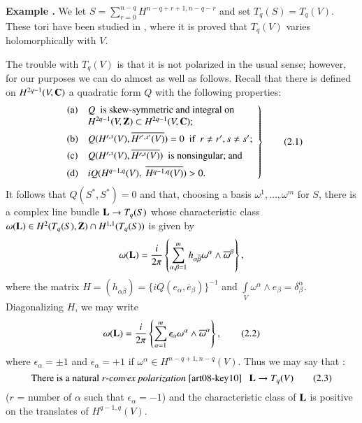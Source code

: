 \medskip
\noindent
{\bf Example .\label{art08-sec2-exam1}}
We let $S=\sum\limits^{n-q}_{r=0}H^{n-q+r+1,n-q-r}$ and set $T_{q}(S)=T_{q}(V)$. These tori have been studied in \cite{art08-key9}, where it is proved that $T_{q}(V)$ varies holomorphically with $V$.
\smallskip

The trouble with $T_{q}(V)$ is that it is not polarized in the usual sense; however, for our purposes we can do almost as well as follows. Recall \cite{art08-key23} that there is defined on $H^{2q-1}(V,\mathbf{C})$ a quadratic form $Q$ with the following properties:
\begin{equation*}
\left.
\begin{array}{cl}
{\rm(a)} & Q \text{~ is skew-symmetric and integral on ~}\\
         & H^{2q-1}(V,\mathbf{Z})\subset H^{2q-1}(V,\mathbf{C});\\[4pt]
{\rm(b)} & Q(H^{r,s}(V),\overline{H^{r',s'}(V)})=0\text{~ if~ } r\neq r', s\neq s';\\[4pt]
{\rm(c)} & Q(H^{r,s}(V),\overline{H^{r,s}(V)})\text{~ is nonsingular; and}\\[4pt]
{\rm(d)} & iQ(H^{q-1,q}(V), \ \overline{H^{q-1,q}(V)})>0.
\end{array}
\right\}\tag{2.1}\label{art08-sec2-eq2.1}
\end{equation*}
It follows that $Q(S^{*},S^{*})=0$ and that, choosing a basis $\omega^{1},\ldots,\omega^{m}$ for $S$, there is a complex line bundle $\mathbf{L}\to T_{q}(S)$ whose characteristic class $\omega(\mathbf{L})\in H^{2}(T_{q}(S),\mathbf{Z})\cap H^{1,1}(T_{q}(S))$ is given by
$$
\omega(\mathbf{L})=\dfrac{i}{2\pi}\left\{\sum\limits^{m}_{\alpha,\beta=1}h_{\alpha\overline{\beta}}\omega^{\alpha}\wedge \overline{\omega}^{\beta}\right\},
$$
where the matrix $H=(h_{\alpha\overline{\beta}})=\{iQ(e_{\alpha},\overline{e}_{\beta})\}^{-1}$ and $\int\limits_{V}\omega^{\alpha}\wedge e_{\beta}=\delta^{\alpha}_{\beta}$. Diagonalizing $H$, we may write
\begin{equation*}
\omega(\mathbf{L})=\dfrac{i}{2\pi}\left\{\sum\limits^{m}_{\alpha=1}\epsilon_{\alpha}\omega^{\alpha}\wedge \overline{\omega}^{\alpha}\right\},\tag{2.2}\label{art08-sec2-eq2.2}
\end{equation*}
where $\epsilon_{\alpha}=\pm 1$ and $\epsilon_{\alpha}=+1$ if $\omega^{\alpha}\in H^{n-q+1,n-q}(V)$. Thus we may say that :
\begin{equation*}
\text{There is a natural } r\text{-{\em convex polarization} \cite{art08-key10}~~ } \mathbf{L}\to T_{q}(V)\tag{2.3}\label{art08-sec2-eq2.3}
\end{equation*}\pageoriginale
($r$ = number of $\alpha$ such that $\epsilon_{\alpha}=-1$) and the characteristic class of $\mathbf{L}$ is positive on the translates of $H^{q-1,q}(V)$.


